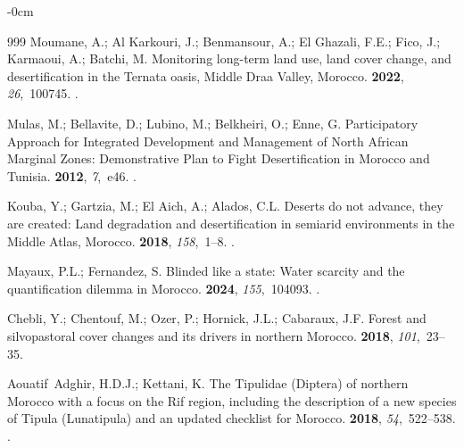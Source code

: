 \documentclass[geomatics,article,accept,pdftex,oneauthor]{Definitions/mdpi}
\begin{document}
\begin{adjustwidth}{-\extralength}{0cm}
\begin{thebibliography}{999}
Moumane, A.; {Al Karkouri}, J.; Benmansour, A.; {El Ghazali}, F.E.; Fico, J.;
  Karmaoui, A.; Batchi, M.
\newblock Monitoring long-term land use, land cover change, and desertification
  in the Ternata oasis, Middle Draa Valley, Morocco.
 {\bf
  2022}, {\em 26},~100745.
.

Mulas, M.; Bellavite, D.; Lubino, M.; Belkheiri, O.; Enne, G.
\newblock Participatory Approach for Integrated Development and Management of
  North African Marginal Zones: Demonstrative Plan to Fight Desertification in
  Morocco and Tunisia.
 {\bf 2012}, {\em 7},~e46.
.

Kouba, Y.; Gartzia, M.; {El Aich}, A.; Alados, C.L.
\newblock Deserts do not advance, they are created: Land degradation and
  desertification in semiarid environments in the Middle Atlas, Morocco.
 {\bf 2018}, {\em 158},~1--8.
.

Mayaux, P.L.; Fernandez, S.
\newblock Blinded like a state: Water scarcity and the quantification dilemma
  in Morocco.
 {\bf 2024}, {\em 155},~104093.
.

Chebli, Y.; Chentouf, M.; Ozer, P.; Hornick, J.L.; Cabaraux, J.F.
\newblock Forest and silvopastoral cover changes and its drivers in northern
  Morocco.
 {\bf 2018}, {\em 101},~23--35.

Aouatif~Adghir, H.D.J.; Kettani, K.
\newblock The Tipulidae (Diptera) of northern Morocco with a focus on the Rif
  region, including the description of a new species of Tipula (Lunatipula) and
  an updated checklist for Morocco.
 {\bf
  2018}, {\em 54},~522--538.
.


\end{thebibliography}
\end{adjustwidth}
\end{document}
